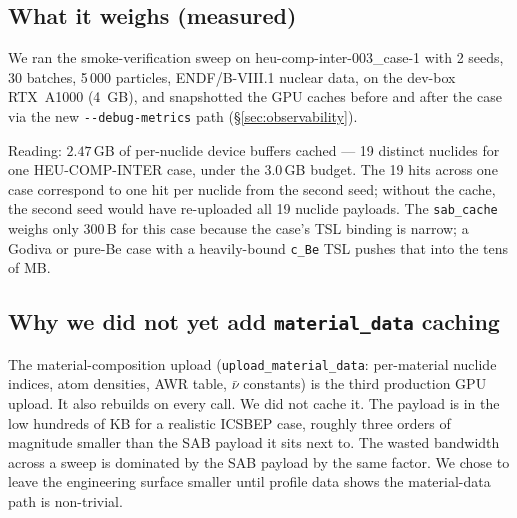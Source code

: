 \subsection{What it weighs (measured)}

We ran the smoke-verification sweep on heu-comp-inter-003\_case-1
with 2 seeds, 30 batches, 5\,000 particles, ENDF/B-VIII.1
nuclear data, on the dev-box RTX~A1000 (4~GB), and snapshotted
the GPU caches before and after the case via the new
\texttt{-{}-debug-metrics} path (§\ref{sec:observability}).

\noindent{}

\noindent
Reading: $2.47\,$GB of per-nuclide device buffers cached --- 19
distinct nuclides for one HEU-COMP-INTER case, under the
3.0\,GB budget. The 19 hits across one case correspond to one
hit per nuclide from the second seed; without the cache, the second
seed would have re-uploaded all 19 nuclide payloads. The
\texttt{sab\_cache} weighs only 300\,B for this case because the
case's TSL binding is narrow; a Godiva or pure-Be case with a
heavily-bound \texttt{c\_Be} TSL pushes that into the tens of MB.

\subsection{Why we did not yet add \texttt{material\_data} caching}

The material-composition upload
(\texttt{upload\_material\_data}: per-material nuclide indices,
atom densities, AWR table, $\bar{\nu}$ constants) is the third
production GPU upload. It also rebuilds on every call. We did not
cache it. The payload is in the low hundreds of KB for a
realistic ICSBEP case, roughly three orders of magnitude smaller
than the SAB payload it sits next to. The wasted bandwidth across
a sweep is dominated by the SAB payload by the same factor. We
chose to leave the engineering surface smaller until profile data
shows the material-data path is non-trivial.
